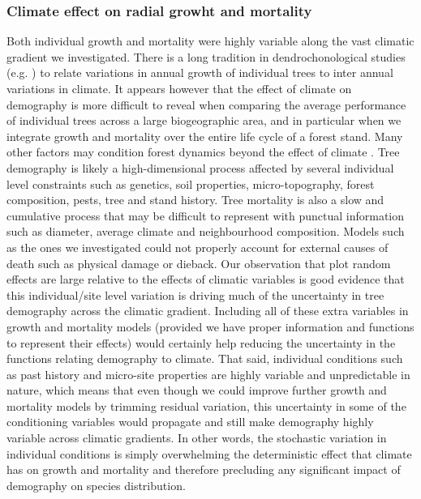 \subsubsection{Climate effect on radial growht and mortality}
Both individual growth and mortality were highly variable along the vast climatic gradient we investigated. There is a long tradition in dendrochonological studies (e.g. \citet{Aussenac2017}) to relate variations in annual growth of individual trees to inter annual variations in climate. It appears however that the effect of climate on demography is more difficult to reveal when comparing the average performance of individual trees across a large biogeographic area, and in particular when we integrate growth and mortality over the entire life cycle of a forest stand. Many other factors may condition forest dynamics beyond the effect of climate \citep{Zhang2015}. Tree demography is likely a high-dimensional process \citep{Clark2011} affected by several individual level constraints such as genetics, soil properties, micro-topography, forest composition, pests, tree and stand history. Tree mortality is also a slow and cumulative process that may be difficult to represent with punctual information such as diameter, average climate and neighbourhood composition. Models such as the ones we investigated could not properly account for external causes of death such as physical damage \citep[uprooting, stem breakage, crushing by other falling trees]{Larson2010} or dieback. Our observation that plot random effects are large relative to the effects of climatic variables is good evidence that this individual/site level variation is driving much of the uncertainty in tree demography across the climatic gradient. Including all of these extra variables in growth and mortality models (provided we have proper information and functions to represent their effects) would certainly help reducing the uncertainty in the functions relating demography to climate. That said, individual conditions such as past history and micro-site properties are highly variable and unpredictable in nature, which means that even though we could improve further growth and mortality models by trimming residual variation, this uncertainty in some of the conditioning variables would propagate and still make demography highly variable across climatic gradients. In other words, the stochastic variation in individual conditions is simply overwhelming the deterministic effect that climate has on growth and mortality and therefore precluding any significant impact of demography on species distribution.

